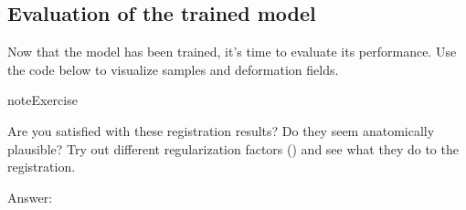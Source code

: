 \documentclass[letterpaper,10pt,english]{jupyterBook}
\begin{document}
\subsection{Evaluation of the trained model}
\label{\detokenize{notebooks/Tutorial6_Registration/Tutorial6_Registration_student:evaluation-of-the-trained-model}}
\sphinxAtStartPar
Now that the model has been trained, it’s time to evaluate its performance. Use the code below to visualize samples and deformation fields.

\begin{sphinxadmonition}{note}{Exercise}

\sphinxAtStartPar
Are you satisfied with these registration results? Do they seem anatomically plausible? Try out different regularization factors () and see what they do to the registration.
\end{sphinxadmonition}

\sphinxAtStartPar
Answer:
\end{document}
